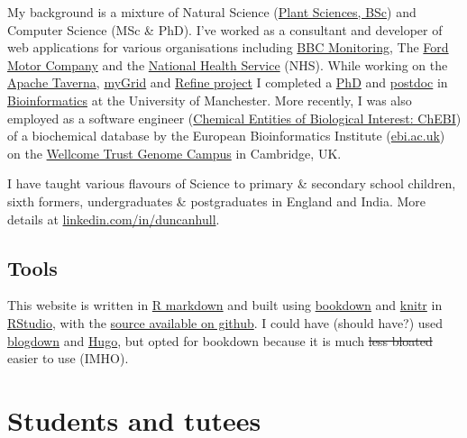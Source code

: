 \documentclass[12pt,]{book}
\begin{document}
My background is a mixture of Natural Science (\href{http://www.plantsciences.manchester.ac.uk/}{Plant Sciences, BSc}) and Computer Science (MSc \& PhD). I've worked as a consultant and developer of web applications for various organisations including \href{https://en.wikipedia.org/wiki/BBC_Monitoring}{BBC Monitoring}, The \href{https://en.wikipedia.org/wiki/Ford_Motor_Company}{Ford Motor Company} and the \href{https://en.wikipedia.org/wiki/National_Health_Service}{National Health Service} (NHS). While working on the \href{https://en.wikipedia.org/wiki/Apache_Taverna}{Apache Taverna}, \href{https://en.wikipedia.org/wiki/MyGrid}{myGrid} and \href{http://www.nactem.ac.uk/pathtext/}{Refine project} I completed a \href{https://ethos.bl.uk/OrderDetails.do?uin=uk.bl.ethos.497578}{PhD} and \href{https://en.wikipedia.org/wiki/Postdoctoral_researcher}{postdoc} in \href{https://en.wikipedia.org/wiki/Bioinformatics}{Bioinformatics} at the University of Manchester. More recently, I was also employed as a software engineer (\href{https://www.ebi.ac.uk/chebi/}{Chemical Entities of Biological Interest: ChEBI}) of a biochemical database by the European Bioinformatics Institute (\href{https://www.ebi.ac.uk}{ebi.ac.uk}) on the \href{https://en.wikipedia.org/wiki/Wellcome_Genome_Campus}{Wellcome Trust Genome Campus} in Cambridge, UK.

I have taught various flavours of Science to primary \& secondary school children, sixth formers, undergraduates \& postgraduates in England and India. More details at \href{https://uk.linkedin.com/in/duncanhull}{linkedin.com/in/duncanhull}.

\hypertarget{tools}{%
\section*{Tools}\label{tools}}

This website is written in \href{https://rmarkdown.rstudio.com/}{R markdown} and built using \href{https://bookdown.org}{bookdown} and \href{https://en.wikipedia.org/wiki/Knitr}{knitr} in \href{https://www.rstudio.com/}{RStudio}, with the \href{https://github.com/dullhunk/hulled}{source available on github}. I could have (should have?) used \href{https://bookdown.org/yihui/blogdown/}{blogdown} and \href{https://gohugo.io}{Hugo}, but opted for bookdown because it is much \sout{less bloated} easier to use (IMHO).

\hypertarget{students-and-tutees}{%
\chapter{Students and tutees}\label{students-and-tutees}}
\end{document}
